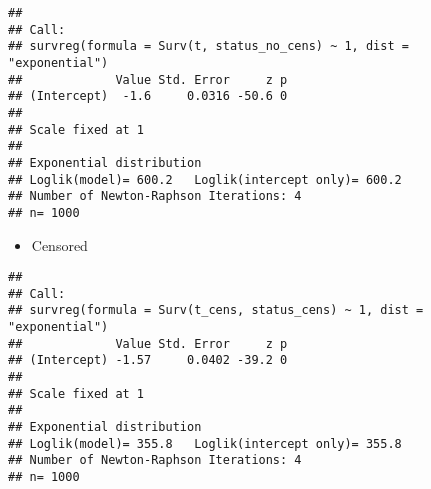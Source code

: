 \documentclass[]{book}
\newenvironment{Shaded}{\begin{snugshade}}{\end{snugshade}}
\newcommand{\KeywordTok}[1]{\textcolor[rgb]{0.13,0.29,0.53}{\textbf{{#1}}}}
\newcommand{\DataTypeTok}[1]{\textcolor[rgb]{0.13,0.29,0.53}{{#1}}}
\newcommand{\DecValTok}[1]{\textcolor[rgb]{0.00,0.00,0.81}{{#1}}}
\newcommand{\StringTok}[1]{\textcolor[rgb]{0.31,0.60,0.02}{{#1}}}
\newcommand{\CommentTok}[1]{\textcolor[rgb]{0.56,0.35,0.01}{\textit{{#1}}}}
\newcommand{\NormalTok}[1]{{#1}}
\providecommand{\tightlist}{%
  \setlength{\itemsep}{0pt}\setlength{\parskip}{0pt}}
\theoremstyle{definition}
\theoremstyle{definition}
\theoremstyle{definition}
\theoremstyle{remark}
\begin{document}
\begin{Shaded}
\end{Shaded}

\begin{verbatim}
## 
## Call:
## survreg(formula = Surv(t, status_no_cens) ~ 1, dist = "exponential")
##             Value Std. Error     z p
## (Intercept)  -1.6     0.0316 -50.6 0
## 
## Scale fixed at 1 
## 
## Exponential distribution
## Loglik(model)= 600.2   Loglik(intercept only)= 600.2
## Number of Newton-Raphson Iterations: 4 
## n= 1000
\end{verbatim}

\begin{itemize}
\tightlist
\item
  Censored
\end{itemize}

\begin{Shaded}
\end{Shaded}

\begin{verbatim}
## 
## Call:
## survreg(formula = Surv(t_cens, status_cens) ~ 1, dist = "exponential")
##             Value Std. Error     z p
## (Intercept) -1.57     0.0402 -39.2 0
## 
## Scale fixed at 1 
## 
## Exponential distribution
## Loglik(model)= 355.8   Loglik(intercept only)= 355.8
## Number of Newton-Raphson Iterations: 4 
## n= 1000
\end{verbatim}
\end{document}
